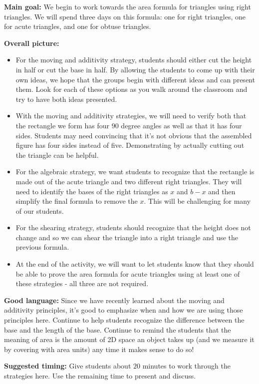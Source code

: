 \documentclass[nooutcomes,noauthor, handout]{ximera}
\begin{document}
\newpage

\begin{instructorNotes} 

{\bf Main goal:} We begin to work towards the area formula for triangles using right triangles. We will spend three days on this formula: one for right triangles, one for acute triangles, and one for obtuse triangles.

{\bf Overall picture:} 
\begin{itemize}
	\item For the moving and additivity strategy, students should either cut the height in half or cut the base in half.  By allowing the students to come up with their own ideas, we hope that the groups begin with different ideas and can present them. Look for each of these options as you walk around the classroom and try to have both ideas presented.
	\item With the moving and additivity strategies, we will need to verify both that the rectangle we form has four $90$ degree angles as well as that it has four sides. Students may need convincing that it's not obvious that the assembled figure has four sides instead of five. Demonstrating by actually cutting out the triangle can be helpful.
	\item For the algebraic strategy, we want students to recognize that the rectangle is made out of the acute triangle and two different right triangles. They will need to identify the bases of the right triangles as $x$ and $b-x$ and then simplify the final formula to remove the $x$. This will be challenging for many of our students.
	\item For the shearing strategy, students should recognize that the height does not change and so we can shear the triangle into a right triangle and use the previous formula. 
	\item At the end of the activity, we will want to let students know that they should be able to prove the area formula for acute triangles using at least one of these strategies - all three are not required.
\end{itemize}


{\bf Good language:} Since we have recently learned about the moving and additivity principles, it's good to emphasize when and how we are using those principles here. Continue to help students recognize the difference between the base and the length of the base. Continue to remind the students that the meaning of area is the amount of 2D space an object takes up (and we measure it by covering with area units) any time it makes sense to do so!



{\bf Suggested timing:} Give students about $20$ minutes to work through the strategies here. Use the remaining time to present and discuss.



\end{instructorNotes}
\end{document}
